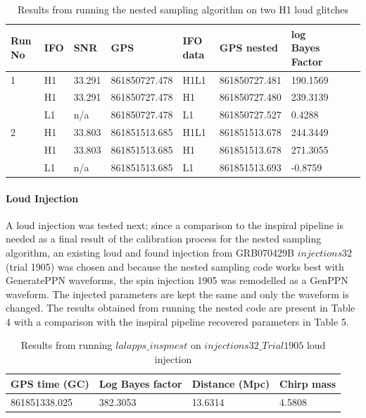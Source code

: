 \documentclass[epsf]{article}
\begin{document}
\begin{table}
 \begin{tabular}{|l|l|l|l|l|l|l|l|l|}
 \hline
 \hline
  Run No & IFO & SNR & GPS & IFO data & GPS nested & log Bayes Factor \\
 \hline
 \hline 
  1 & H1 & 33.291 & 861850727.478 & H1L1 & 861850727.481 & 190.1569 \\
 \hline
    & H1 & 33.291 & 861850727.478 & H1 & 861850727.480 & 239.3139 \\
    & L1 &  n/a      & 861850727.478 & L1 & 861850727.527 & 0.4288 \\
 \hline
  2 & H1 & 33.803 & 861851513.685 & H1L1 & 861851513.678 & 244.3449 \\
 \hline
    & H1 & 33.803 & 861851513.685 & H1 & 861851513.678 & 271.3055 \\
    & L1 &   n/a     & 861851513.685 & L1 & 861851513.693 & -0.8759 \\
 \hline
 \hline
 \end{tabular} 
 \caption{Results from running the nested sampling algorithm on two H1 loud glitches}
 \label{Table 3}
\end{table}

\paragraph{Loud Injection}

A loud injection was tested next; since a comparison to the inspiral pipeline is needed as a final result of the calibration process for the nested sampling algorithm, an existing loud and found injection from GRB070429B $injections32$ (trial 1905) was chosen and because the nested sampling code works best with GeneratePPN waveforms, the spin injection 1905 was remodelled as a GenPPN waveform. The injected parameters are kept the same and only the waveform is changed. The results obtained from running the nested code are present in Table 4 with a comparison with the inspiral pipeline recovered parameters in Table 5. 

\begin{table}[ht]
 \begin{tabular}{|l|l|l|l|}
 \hline
 \hline
 GPS time (GC) & Log Bayes factor & Distance (Mpc) & Chirp mass \\
 \hline
 \hline
 861851338.025 & 382.3053 & 13.6314 & 4.5808 \\
 \hline
 \hline
 \end{tabular} 
 \caption{Results from running $lalapps\_inspnest$ on $injections32\_Trial1905$ loud injection}
 \label{Table 4}
\end{table}
\end{document}
